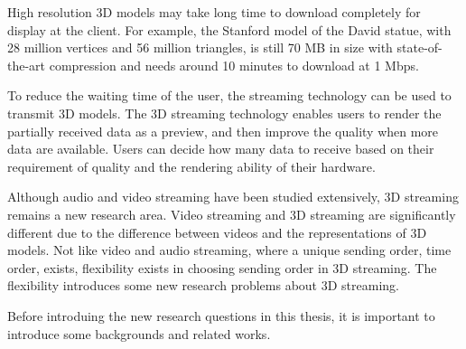 \documentclass[11pt, a4paper]{report}
\begin{document}
    High resolution 3D models may take long time to download completely
    for display at the client. 
    For example, the Stanford model of the David statue, with 28 million vertices and
    56 million triangles, is still 70 MB in size with
    state-of-the-art compression \cite{alliez2001progressive} and needs around 10 minutes
    to download at 1 Mbps.
    
    To reduce the waiting time of the user, 
    the streaming technology can be used to transmit 3D models. 
    The 3D streaming technology enables users to render the partially received data as a preview, 
    and then improve the quality when more data are available. 
    Users can decide how many data to receive based on their requirement of quality
    and the rendering ability of their hardware. 

    Although audio and video streaming have been studied extensively, 
    3D streaming remains a new research area. 
    Video streaming and 3D streaming are significantly different
    due to the difference between videos and the representations of 3D models. 
    Not like video and audio streaming, where a unique sending order, time order, 
    exists, flexibility exists in choosing sending order in 3D streaming. The flexibility
    introduces some new research problems about 3D streaming.

    Before introduing the new research questions in this thesis,
    it is important to introduce some backgrounds and related works.
\end{document}
